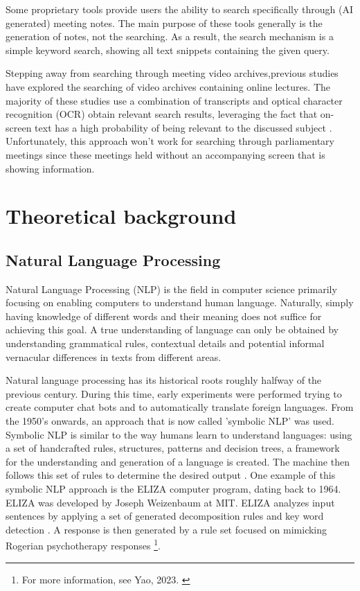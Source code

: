 \documentclass[twoside]{uva-inf-bachelor-thesis}
\begin{document}
Some proprietary tools provide users the ability to search specifically through (AI generated) meeting notes. The main purpose of these tools generally is the generation of notes, not the searching. As a result, the search mechanism is a simple keyword search, showing all text snippets containing the given query. 

Stepping away from searching through meeting video archives,previous studies have explored the searching of video archives containing online lectures. The majority of these studies use a combination of transcripts and optical character recognition (OCR) obtain relevant search results, leveraging the fact that on-screen text has a high probability of being relevant to the discussed subject \cite{Adcock10, yang14}. 
Unfortunately, this approach won't work for searching through parliamentary meetings since these meetings held without an accompanying screen that is showing information. 

\chapter{Theoretical background}

\section{Natural Language Processing}
Natural Language Processing (NLP) is the field in computer science primarily focusing on enabling computers to understand human language. Naturally, simply having knowledge of different words and their meaning does not suffice for achieving this goal. A true understanding of language can only be obtained by understanding grammatical rules, contextual details and potential informal vernacular differences in texts from different areas.


Natural language processing has its historical roots roughly halfway of the previous century. During this time, early experiments were performed trying to create computer chat bots and to automatically translate foreign languages. From the 1950's onwards, an approach that is now called 'symbolic NLP' was used. Symbolic NLP is similar to the way humans learn to understand languages: using a set of handcrafted rules, structures, patterns and decision trees, a framework for the understanding and generation of a language is created. The machine then follows this set of rules to determine the desired output \cite{Dale00}. One example of this symbolic NLP approach is the ELIZA computer program, dating back to 1964. ELIZA was developed by Joseph Weizenbaum at MIT. ELIZA analyzes input sentences by applying a set of generated decomposition rules and key word detection \cite{weizenbaum66} \cite{Jurafsky08}. A response is then generated by a rule set focused on mimicking Rogerian psychotherapy responses \footnote{For more information, see Yao, 2023. \cite{Yao23}}. 
\end{document}
